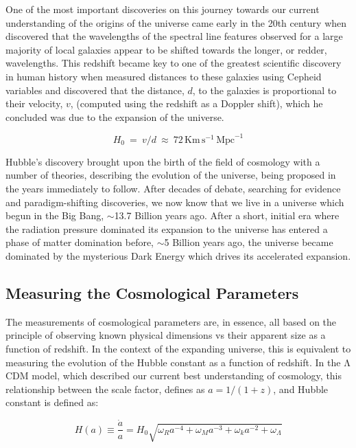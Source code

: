 One of the most important discoveries on this journey towards our current understanding of the origins of the universe came early in the 20th century when \citep{Slipher1915} discovered that the wavelengths of the spectral line features observed for a large majority of local galaxies appear to be shifted towards the longer, or redder, wavelengths. This redshift became key to one of the greatest scientific discovery in human history when \citep{Hubble1929} measured distances to these galaxies using Cepheid variables and discovered that the distance, $d$, to the galaxies is proportional to their velocity, $v$, (computed using the redshift as a Doppler shift), which he concluded was due to the expansion of the universe.

\begin{equation}
H_0~=~v/d~\approx~72\,\mathrm{Km}\,\mathrm{s}^{-1}\,\mathrm{Mpc}^{-1}
\end{equation}

Hubble's discovery brought upon the birth of the field of cosmology with a number of theories, describing the evolution of the universe, being proposed in the years immediately to follow. After decades of debate, searching for evidence and paradigm-shifting discoveries, we now \citep{Adam2016} know that we live in a universe which begun in the Big Bang, $\sim$13.7 Billion years ago. After a short, initial era where the radiation pressure dominated its expansion to the universe has entered a phase of matter domination before, $\sim$5 Billion years ago, the universe became dominated by the mysterious Dark Energy which drives its accelerated expansion.

\subsection{Measuring the Cosmological Parameters}
The measurements of cosmological parameters are, in essence, all based on the principle of observing known physical dimensions vs their apparent size as a function of redshift. In the context of the expanding universe, this is equivalent to measuring the evolution of the Hubble constant as a function of redshift. In the $\mathrm{\Lambda}$CDM model, which described our current best understanding of cosmology, this relationship between the scale factor, defines as $a = 1 / (1 + z)$, and Hubble constant is defined as:

\begin{equation} \label{eq:ScaleFactor}
  H(a) \equiv \frac{\dot{a}}{a} = H_0 \sqrt{\omega_{R}a^{-4} + \omega_{M}a^{-3} + \omega_{k}a^{-2} + \omega_{\Lambda}}
\end{equation}

